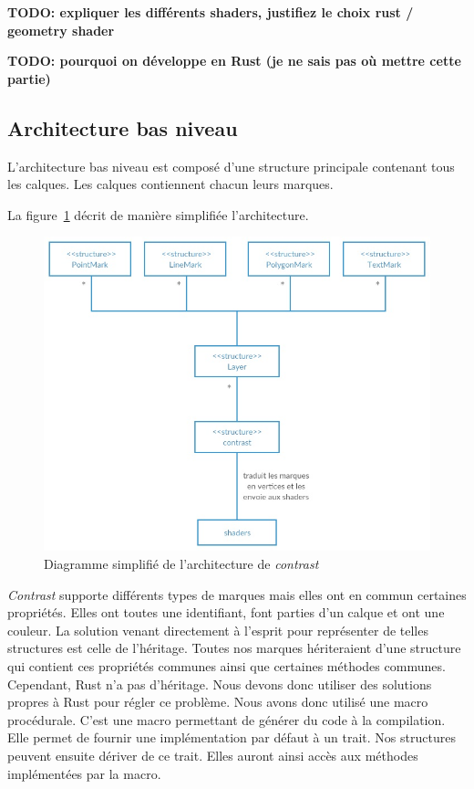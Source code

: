 \documentclass[12pt]{article}
\begin{document}
\textbf{TODO: expliquer les différents shaders, justifiez le choix rust / geometry shader}

\textbf{TODO: pourquoi on développe en Rust (je ne sais pas où mettre cette partie)}

\subsection{Architecture bas niveau}

L'architecture bas niveau est composé d'une structure principale contenant tous les calques. Les calques contiennent
chacun leurs marques.

La figure~\ref{fig:arch} décrit de manière simplifiée l'architecture.

\begin{figure}[htp]
  \centering
  \includegraphics[scale=1.0]{images/architecture}
  \caption{Diagramme simplifié de l'architecture de \textit{contrast} }
  \label{fig:arch}
\end{figure}

\textit{Contrast} supporte différents types de marques mais elles ont en commun certaines propriétés.
Elles ont toutes une identifiant, font parties d'un calque et ont une couleur.
La solution venant directement à l'esprit pour représenter de telles structures est celle de l'héritage.
Toutes nos marques hériteraient d'une structure qui contient ces propriétés communes ainsi que certaines
méthodes communes.
Cependant, Rust n'a pas d'héritage. Nous devons donc utiliser des solutions propres à Rust pour régler
ce problème.
Nous avons donc utilisé une macro procédurale. C'est une macro permettant de générer du code à la
compilation. Elle permet de fournir une implémentation par défaut à un trait. Nos structures peuvent
ensuite dériver de ce trait. Elles auront ainsi accès aux méthodes implémentées par la macro.
\end{document}
